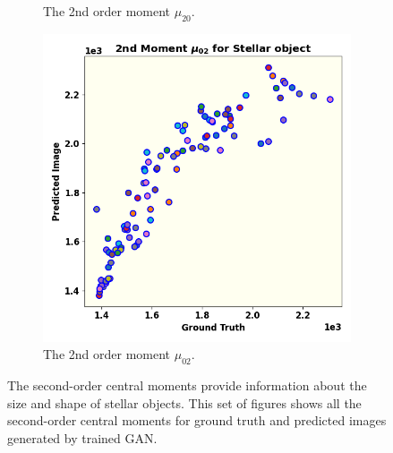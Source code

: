 \documentclass[fleqn,usenatbib,twocolumn]{mnras}
\begin{document}
\begin{figure}
\begin{subfigure}{0.33\linewidth}
		\caption{The 2nd order moment $\mu_{20}$.}
		\label{fig:mom5}
	\end{subfigure}\hfill
	\begin{subfigure}{0.33\linewidth}
		\includegraphics[width=\linewidth]{../fig/moments/mom5.png}
		\caption{The 2nd order moment $\mu_{02}$.}
		\label{fig:mom6}
	\end{subfigure}\hfill
	\caption{The second-order central moments provide information about the size and shape of stellar objects. This set of figures shows all the second-order central moments for ground truth and predicted images generated by trained GAN.}
	\label{fig:struc}
\end{figure}
\end{document}
